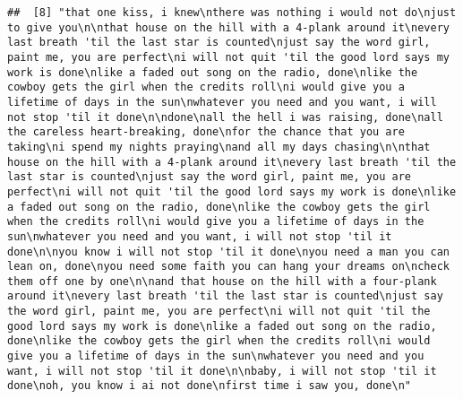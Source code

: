 \documentclass[]{article}
\begin{document}
\begin{verbatim}
##  [8] "that one kiss, i knew\nthere was nothing i would not do\njust to give you\n\nthat house on the hill with a 4-plank around it\nevery last breath 'til the last star is counted\njust say the word girl, paint me, you are perfect\ni will not quit 'til the good lord says my work is done\nlike a faded out song on the radio, done\nlike the cowboy gets the girl when the credits roll\ni would give you a lifetime of days in the sun\nwhatever you need and you want, i will not stop 'til it done\n\ndone\nall the hell i was raising, done\nall the careless heart-breaking, done\nfor the chance that you are taking\ni spend my nights praying\nand all my days chasing\n\nthat house on the hill with a 4-plank around it\nevery last breath 'til the last star is counted\njust say the word girl, paint me, you are perfect\ni will not quit 'til the good lord says my work is done\nlike a faded out song on the radio, done\nlike the cowboy gets the girl when the credits roll\ni would give you a lifetime of days in the sun\nwhatever you need and you want, i will not stop 'til it done\n\nyou know i will not stop 'til it done\nyou need a man you can lean on, done\nyou need some faith you can hang your dreams on\ncheck them off one by one\n\nand that house on the hill with a four-plank around it\nevery last breath 'til the last star is counted\njust say the word girl, paint me, you are perfect\ni will not quit 'til the good lord says my work is done\nlike a faded out song on the radio, done\nlike the cowboy gets the girl when the credits roll\ni would give you a lifetime of days in the sun\nwhatever you need and you want, i will not stop 'til it done\n\nbaby, i will not stop 'til it done\noh, you know i ai not done\nfirst time i saw you, done\n"                                                                                                                                                                                                                                                                                                                                                                                                                                                                                                                                                                                                                                                                                                                                                                                                                                                                                                                                                                                                                                                                                                                                                                      

\end{verbatim}
\end{document}
